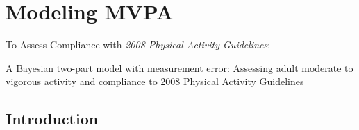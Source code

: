 \documentclass[handout]{beamer}\usepackage[]{graphicx}\usepackage[]{color}
\begin{document}
% 
% 
% 
% 
% 

\section{Modeling MVPA}
\begin{frame}
To Assess Compliance with \emph{2008 Physical Activity Guidelines}:

\vspace{0.4cm}
\huge A Bayesian two-part model with measurement error: Assessing adult moderate to vigorous activity and compliance to 2008 Physical Activity Guidelines

\end{frame}

\subsection{Introduction}
\end{document}
